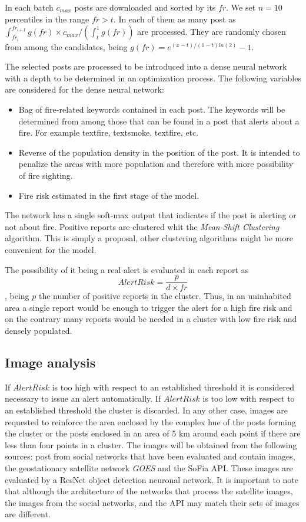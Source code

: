 \documentclass{article}
\begin{document}
In each batch $c_{max}$ posts are downloaded and sorted by its $fr$.
We set $n=10$ percentiles in the range $fr > t$.
In each of them as many post as $\int_{fr_i}^{fr_{i+1}}g(fr) \times c_{max}/(\int_t^1g(fr))$ are processed.
They are randomly chosen from among the candidates, being $g(fr)=e^{(x-t)/(1-t)ln(2)}-1$.

The selected posts are processed to be introduced into a dense neural network with a depth to be determined in an optimization process.
The following variables are considered for the dense neural network:
\begin{itemize}
	\item Bag of fire-related keywords contained in each post.
	The keywords will be determined from among those that can be found in a post that alerts about a fire.
	For example text{fire}, text{smoke}, text{fire}, etc.
	\item Reverse of the population density in the position of the post.
	It is intended to penalize the areas with more population and therefore with more possibility of fire sighting.
	\item Fire risk estimated in the first stage of the model.
\end{itemize}
The network has a single soft-max output that indicates if the post is alerting or not about fire.
Positive reports are clustered whit the \textit{Mean-Shift Clustering} algorithm.
This is simply a proposal, other clustering algorithms might be more convenient for the model.

The possibility of it being a real alert is evaluated in each report as
\[AlertRisk = \frac{p}{d\times fr}\],
being $p$ the number of positive reports in the cluster.
Thus, in an uninhabited area a single report would be enough to trigger the alert for a high fire risk and on the contrary many reports would be needed in a cluster with low fire risk and densely populated.

\subsection{Image analysis}

If $AlertRisk$ is too high with respect to an established threshold it is considered necessary to issue an alert automatically.
If $AlertRisk$ is too low with respect to an established threshold the cluster is discarded.
In any other case, images are requested to reinforce the area enclosed by the complex hue of the posts forming the cluster or the posts enclosed in an area of 5 km around each point if there are less than four points in a cluster.
The images will be obtained from the following sources: post from social networks that have been evaluated and contain images, the geostationary satellite network \textit{GOES} and the SoFia API.
These images are evaluated by a ResNet\cite{he2016deep} object detection neuronal network. It is important to note that although the architecture of the networks that process the satellite images, the images from the social networks, and the API may match their sets of images are different.
\end{document}
